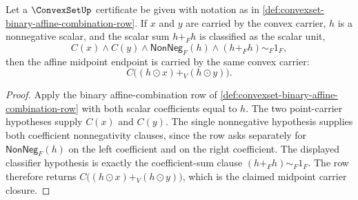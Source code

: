 \begin{theorem}
\label{thm:convexset-midpoint-affine-combination-closure}
Let a $\ConvexSetUp$ certificate be given with notation as in
\autoref{def:convexset-binary-affine-combination-row}. If $x$ and $y$ are
carried by the convex carrier, $h$ is a nonnegative scalar, and the scalar sum
$h+_F h$ is classified as the scalar unit,
$$
C(x)\land C(y)\land \mathsf{NonNeg}_F(h)\land (h+_F h)\sim_F 1_F,
$$
then the affine midpoint endpoint is carried by the same convex carrier:
$$
C\bigl((h\odot x)+_V(h\odot y)\bigr).
$$
\end{theorem}
\begin{proof}
Apply the binary affine-combination row of
\autoref{def:convexset-binary-affine-combination-row} with both scalar
coefficients equal to $h$. The two point-carrier hypotheses supply $C(x)$ and
$C(y)$. The single nonnegative hypothesis supplies both coefficient
nonnegativity clauses, since the row asks separately for
$\mathsf{NonNeg}_F(h)$ on the left coefficient and on the right coefficient.
The displayed classifier hypothesis is exactly the coefficient-sum clause
$(h+_F h)\sim_F 1_F$. The row therefore returns
$C\bigl((h\odot x)+_V(h\odot y)\bigr)$, which is the claimed midpoint carrier
closure.
\end{proof}

